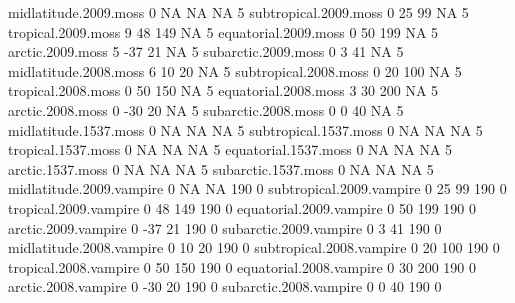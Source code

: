 \documentclass{article}
\numberwithin{exercise}{section}
\begin{document}
\begin{Schunk}
\begin{Soutput}
midlatitude.2009.moss             0          NA            NA        NA              5
subtropical.2009.moss             0          25            99        NA              5
tropical.2009.moss                9          48           149        NA              5
equatorial.2009.moss              0          50           199        NA              5
arctic.2009.moss                  5         -37            21        NA              5
subarctic.2009.moss               0           3            41        NA              5
midlatitude.2008.moss             6          10            20        NA              5
subtropical.2008.moss             0          20           100        NA              5
tropical.2008.moss                0          50           150        NA              5
equatorial.2008.moss              3          30           200        NA              5
arctic.2008.moss                  0         -30            20        NA              5
subarctic.2008.moss               0           0            40        NA              5
midlatitude.1537.moss             0          NA            NA        NA              5
subtropical.1537.moss             0          NA            NA        NA              5
tropical.1537.moss                0          NA            NA        NA              5
equatorial.1537.moss              0          NA            NA        NA              5
arctic.1537.moss                  0          NA            NA        NA              5
subarctic.1537.moss               0          NA            NA        NA              5
midlatitude.2009.vampire          0          NA            NA       190              0
subtropical.2009.vampire          0          25            99       190              0
tropical.2009.vampire             0          48           149       190              0
equatorial.2009.vampire           0          50           199       190              0
arctic.2009.vampire               0         -37            21       190              0
subarctic.2009.vampire            0           3            41       190              0
midlatitude.2008.vampire          0          10            20       190              0
subtropical.2008.vampire          0          20           100       190              0
tropical.2008.vampire             0          50           150       190              0
equatorial.2008.vampire           0          30           200       190              0
arctic.2008.vampire               0         -30            20       190              0
subarctic.2008.vampire            0           0            40       190              0

\end{Soutput}
\end{Schunk}
\end{document}
